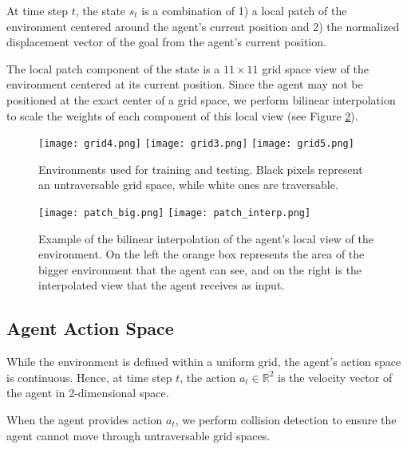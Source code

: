         At time step $t$, the state $s_t$ is a combination of 1) a local patch of the environment
        centered around the agent's current position and 2) the normalized displacement vector
        of the goal from the agent's current position.

        The local patch component of the state is a $11 \times 11$ grid space view of the
        environment centered at its current position. Since the agent may not be positioned at
        the exact center of a grid space, we perform bilinear interpolation to scale the weights
        of each component of this local view (see Figure \ref{fig:patch_view}).

        \begin{figure}[H]
        \centering
            \texttt{[image: grid4.png]}
            \texttt{[image: grid3.png]}
            \texttt{[image: grid5.png]}
            \caption{Environments used for training and testing. Black pixels represent
                     an untraversable grid space, while white ones are traversable.}
            \label{fig:environments}
        \end{figure}

        \begin{figure}[H]
            \centering
                \texttt{[image: patch\_big.png]}
                \texttt{[image: patch\_interp.png]}
                \caption{Example of the bilinear interpolation of the agent's local view of
                         the environment. On the left the orange box represents the area of
                         the bigger environment that the agent can see, and on the right is
                         the interpolated view that the agent receives as input.}
                \label{fig:patch_view}
        \end{figure}

    \subsection{Agent Action Space}\label{sec:action_space}
        While the environment is defined within a uniform grid, the agent's action space is
        continuous. Hence, at time step $t$, the action $a_t \in \mathbb{R}^2$ is the velocity
        vector of the agent in 2-dimensional space.

        When the agent provides action $a_t$, we perform collision detection to ensure the agent
        cannot move through untraversable grid spaces.

